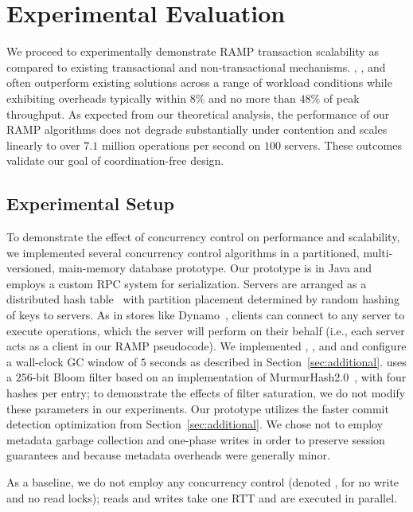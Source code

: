 
\section{Experimental Evaluation}
\label{sec:evaluation}
\label{sec:ramp-evaluation}

We proceed to experimentally demonstrate RAMP transaction scalability
as compared to existing transactional and non-transactional
mechanisms. \rapl, \rapb, and often \raps outperform existing
solutions across a range of workload conditions while exhibiting
overheads typically within $8\%$ and no more than $48\%$ of peak
throughput. As expected from our theoretical analysis, the performance
of our RAMP algorithms does not degrade substantially under contention
and scales linearly to over $7.1$ million operations per second on
$100$ servers. These outcomes validate our goal of coordination-free
design.

\subsection{Experimental Setup}
\label{sec:setup}

To demonstrate the effect of concurrency control on performance and
scalability, we implemented several concurrency control algorithms in
a partitioned, multi-versioned, main-memory database prototype. Our
prototype is in Java and employs a custom RPC system for
serialization. Servers are arranged as a distributed hash
table~\cite{chord} with partition placement determined by random
hashing of keys to servers. As in stores like Dynamo~\cite{dynamo},
clients can connect to any server to execute operations, which the
server will perform on their behalf (i.e., each server acts as a
client in our RAMP pseudocode). We implemented \rapl, \raps, and \rapb
and configure a wall-clock GC window of $5$ seconds as described in
Section~\ref{sec:additional}. \rapb uses a $256$-bit Bloom filter
based on an implementation of MurmurHash2.0~\cite{murmurhash}, with
four hashes per entry; to demonstrate the effects of filter
saturation, we do not modify these parameters in our experiments. Our
prototype utilizes the faster commit detection optimization from
Section~\ref{sec:additional}. We chose not to employ metadata garbage
collection and one-phase writes in order to preserve session
guarantees and because metadata overheads were generally minor.

 As a baseline, we do not employ
any concurrency control (denoted \nwnr, for no write and no read
locks); reads and writes take one RTT and are executed in parallel.

